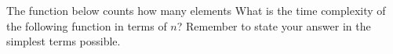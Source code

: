 \begin{prob}
    The function below counts how many elements 
    What is the time complexity of the following function in terms of $n$?
    Remember to state your answer in the simplest terms possible.

    \inputminted[lastline=6]{python}{\thisdir/code.py}


\end{prob}
